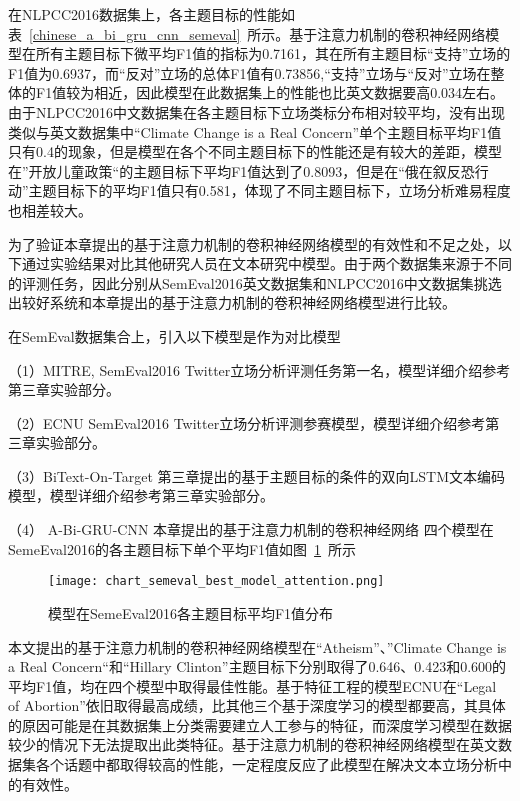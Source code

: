 在NLPCC2016数据集上，各主题目标的性能如表~\ref{chinese_a_bi_gru_cnn_semeval}~所示。基于注意力机制的卷积神经网络模型在所有主题目标下微平均F1值的指标为0.7161，其在所有主题目标“支持”立场的F1值为0.6937，而“反对”立场的总体F1值有0.73856,“支持”立场与“反对”立场在整体的F1值较为相近，因此模型在此数据集上的性能也比英文数据要高0.034左右。由于NLPCC2016中文数据集在各主题目标下立场类标分布相对较平均，没有出现类似与英文数据集中“Climate Change is a Real Concern”单个主题目标平均F1值只有0.4的现象，但是模型在各个不同主题目标下的性能还是有较大的差距，模型在”开放儿童政策“的主题目标下平均F1值达到了0.8093，但是在“俄在叙反恐行动”主题目标下的平均F1值只有0.581，体现了不同主题目标下，立场分析难易程度也相差较大。


为了验证本章提出的基于注意力机制的卷积神经网络模型的有效性和不足之处，以下通过实验结果对比其他研究人员在文本研究中模型。由于两个数据集来源于不同的评测任务，因此分别从SemEval2016英文数据集和NLPCC2016中文数据集挑选出较好系统和本章提出的基于注意力机制的卷积神经网络模型进行比较。

在SemEval数据集合上，引入以下模型是作为对比模型

（1）MITRE, SemEval2016 Twitter立场分析评测任务第一名，模型详细介绍参考第三章实验部分。

（2）ECNU   SemEval2016 Twitter立场分析评测参赛模型，模型详细介绍参考第三章实验部分。

（3）BiText-On-Target 第三章提出的基于主题目标的条件的双向LSTM文本编码模型，模型详细介绍参考第三章实验部分。

（4） A-Bi-GRU-CNN 本章提出的基于注意力机制的卷积神经网络
四个模型在SemeEval2016的各主题目标下单个平均F1值如图~\ref{chart_semeval_best_model_attention}~所示
\begin{figure}[htbp]
	\centering
	\texttt{[image: chart\_semeval\_best\_model\_attention.png]}
	\caption[rnn_vanish]{模型在SemeEval2016各主题目标平均F1值分布}
	\label{chart_semeval_best_model_attention}
\end{figure}

本文提出的基于注意力机制的卷积神经网络模型在“Atheism”、”Climate Change is a Real Concern“和“Hillary Clinton”主题目标下分别取得了0.646、0.423和0.600的平均F1值，均在四个模型中取得最佳性能。基于特征工程的模型ECNU在“Legal of Abortion”依旧取得最高成绩，比其他三个基于深度学习的模型都要高，其具体的原因可能是在其数据集上分类需要建立人工参与的特征，而深度学习模型在数据较少的情况下无法提取出此类特征。基于注意力机制的卷积神经网络模型在英文数据集各个话题中都取得较高的性能，一定程度反应了此模型在解决文本立场分析中的有效性。

